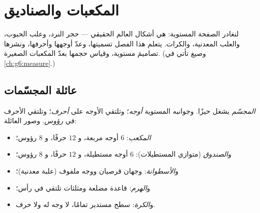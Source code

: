 \chapter{المكعبات والصناديق}\label{ch:g5:solids}

لنغادر الصفحة المستوية:  هي أشكال العالم الحقيقي ---
حجر النرد، وعلب الحبوب، والعلب المعدنية، والكرات. يتعلم هذا الفصل
تسميتها، وعدّ أوجهها وأحرفها، ونشرها تصاميمَ مستوية، وقياس
حجمها بعدّ المكعبات الصغيرة. (وصيغ  تأتي في
\cref{ch:g6:measure}.)

\section{عائلة المجسّمات}

\begin{definition}\label{def:g5:solids:def}
\emph{المجسّم} يشغل حيزًا. وجوانبه المستوية
\emph{أوجه}؛ وتلتقي الأوجه على \emph{أحرف}؛
وتلتقي الأحرف في \emph{رؤوس}. وصور
العائلة:
\begin{itemize}
  \item \emph{المكعب}: $6$ أوجه مربعة، و $12$ حرفًا،
        و $8$ رؤوس؛
  \item و\emph{الصندوق} (متوازي المستطيلات): $6$
        أوجه مستطيلة، و $12$ حرفًا، و $8$ رؤوس؛
  \item و\emph{الأسطوانة}: وجهان قرصيان ووجه ملفوف
        (علبة معدنية)؛
  \item و\emph{الهرم}: قاعدة مضلعة ومثلثات تلتقي في
        رأس؛
  \item و\emph{الكرة}: سطح مستدير تمامًا، لا وجه له ولا
        حرف.
\end{itemize}
\end{definition}

